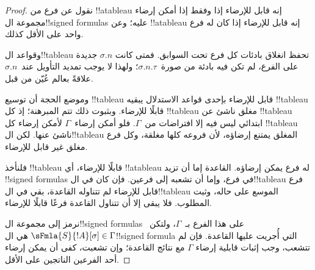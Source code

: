 \documentclass[../../../include/open-logic-section]{subfiles}
\begin{document}
\begin{proof}
نقول عن فرع من !!a{tableau} إنه قابل للإرضاء إذا وفقط إذا أمكن إرضاء
مجموعة ال!!{signed formula}s عليه؛ وعن !!a{tableau} إنه قابل للإرضاء
إذا كان له فرع واحد على الأقل كذلك.

وقواعد ال!!{tableau} تحفظ انغلاق بادئات كل فرع تحت السوابق. فمتى كانت
$\sigma.n$ جديدة على الفرع، لم تكن فيه بادئة من صورة~$\sigma.n.\tau$؛
ولهذا لا يوجب تمديد التأويل عند~$\sigma.n$ علاقةً بعالم عُيّن من قبل.

وموضع الحجة أن توسيع !!{tableau} قابل للإرضاء بإحدى قواعد الاستدلال
يبقيه !!{tableau} قابلًا للإرضاء. وبثبوت ذلك تتم المبرهنة؛ إذ كل
!!{tableau} مغلق ناشئ عن !!{tableau} ابتدائي ليس فيه إلا افتراضات
من~$\Gamma$. فلو أمكن إرضاء~$\Gamma$ لأمكن إرضاء كل !!{tableau}
ناشئ عنها. لكن ال!!{tableau} المغلق يمتنع إرضاؤه، لأن فروعه كلها
مغلقة، وكل فرع مغلق غير قابل للإرضاء.

فلنأخذ !!{tableau} قابلًا للإرضاء، أي !!a{tableau} له فرع يمكن إرضاؤه.
القاعدة إما أن تزيد !!{signed formula}s في فرع، وإما أن تشعبه إلى
فرعين. فإن كان في ال!!{tableau} فرع قابل للإرضاء لم تتناوله القاعدة،
بقي في ال!!{tableau} الموسع على حاله، وثبت المطلوب. فلا يبقى إلا أن
تتناول القاعدة فرعًا قابلًا للإرضاء.

نرمز إلى مجموعة ال!!{signed formula}s على هذا الفرع بـ~$\Gamma$،
ولتكن~$\sFmla{S}{!A}[\sigma] \in \Gamma$ هي ال!!{signed formula}
التي أُجريت عليها القاعدة. فإن لم تتشعب، وجب إثبات قابلية إرضاء
$\Gamma$ مع نتائج القاعدة؛ وإن تشعبت، كفى أن يمكن إرضاء أحد الفرعين
الناتجين على الأقل.


\end{proof}
\end{document}
